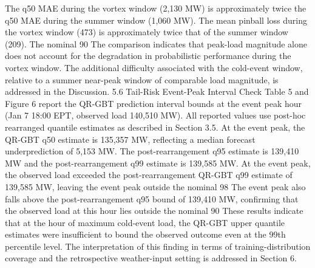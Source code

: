 The q50 MAE during the vortex window (2,130 MW) is approximately twice the q50 MAE during the summer window (1,060 MW). The mean pinball loss during the vortex window (473) is approximately twice that of the summer window (209). The nominal 90%
The comparison indicates that peak-load magnitude alone does not account for the degradation in probabilistic performance during the vortex window. The additional difficulty associated with the cold-event window, relative to a summer near-peak window of comparable load magnitude, is addressed in the Discussion.
5.6 Tail-Risk Event-Peak Interval Check
Table 5 and Figure 6 report the QR-GBT prediction interval bounds at the event peak hour (Jan 7 18:00 EPT, observed load 140,510 MW). All reported values use post-hoc rearranged quantile estimates as described in Section 3.5.
At the event peak, the QR-GBT q50 estimate is 135,357 MW, reflecting a median forecast underprediction of 5,153 MW. The post-rearrangement q95 estimate is 139,410 MW and the post-rearrangement q99 estimate is 139,585 MW. At the event peak, the observed load exceeded the post-rearrangement QR-GBT q99 estimate of 139,585 MW, leaving the event peak outside the nominal 98%
The event peak also falls above the post-rearrangement q95 bound of 139,410 MW, confirming that the observed load at this hour lies outside the nominal 90%
These results indicate that at the hour of maximum cold-event load, the QR-GBT upper quantile estimates were insufficient to bound the observed outcome even at the 99th percentile level. The interpretation of this finding in terms of training-distribution coverage and the retrospective weather-input setting is addressed in Section 6.